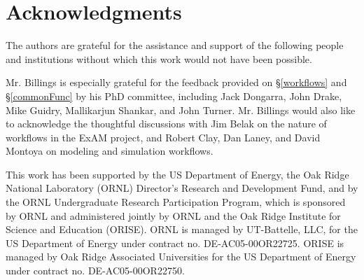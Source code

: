 \section{Acknowledgments} The authors are grateful for the assistance and
support of the following people and institutions without which this work would
not have been possible.

Mr. Billings is especially grateful for the feedback provided on
\S\ref{workflows} and \S\ref{commonFunc} by his PhD committee, including Jack Dongarra, John Drake, Mike Guidry, Mallikarjun Shankar, and John Turner. Mr.
Billings would also like to acknowledge the thoughtful discussions with Jim
Belak on the nature of workflows in the ExAM project, and Robert Clay, Dan
Laney, and David Montoya on modeling and simulation workflows.

This work has been supported by the US Department of Energy, the Oak Ridge National Laboratory (ORNL) Director's Research and Development Fund, and by the ORNL
Undergraduate Research Participation Program, which is sponsored by ORNL and
administered jointly by ORNL and the Oak Ridge Institute for Science and
Education (ORISE). ORNL is managed by UT-Battelle, LLC, for the US Department
of Energy under contract no. DE-AC05-00OR22725. ORISE is managed by Oak Ridge
Associated Universities for the US Department of Energy under contract no.
DE-AC05-00OR22750.
